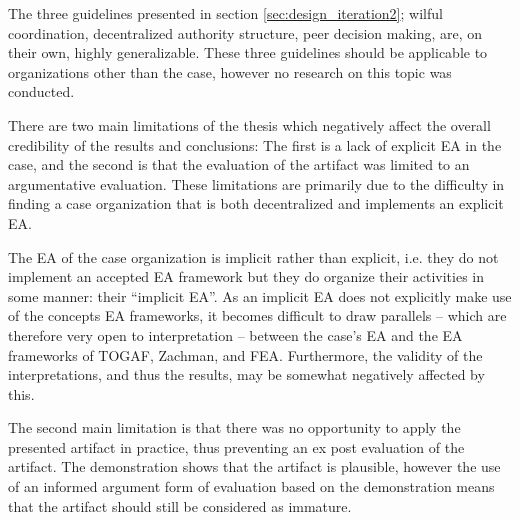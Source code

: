 %
%
%
%
%
%
The three guidelines presented in section \ref{sec:design_iteration2}; wilful coordination, decentralized authority structure, peer decision making, are, on their own, highly generalizable. These three guidelines should be applicable to organizations other than the case, however no research on this topic was conducted.

There are two main limitations of the thesis which negatively affect the overall credibility of the results and conclusions: The first is a lack of explicit EA in the case, and the second is that the evaluation of the artifact was limited to an argumentative evaluation. These limitations are primarily due to the difficulty in finding a case organization that is both decentralized and implements an explicit EA. 

The EA of the case organization is implicit rather than explicit, i.e. they do not implement an accepted EA framework but they do organize their activities in some manner: their ``implicit EA''. As an implicit EA does not explicitly make use of the concepts EA frameworks, it becomes difficult to draw parallels -- which are therefore very open to interpretation -- between the case's EA and the EA frameworks of TOGAF, Zachman, and FEA.  Furthermore, the validity of the interpretations, and thus the results, may be somewhat negatively affected by this.

The second main limitation is that there was no opportunity to apply the presented artifact in practice, thus preventing an ex post evaluation of the artifact. The demonstration shows that the artifact is plausible, however the use of an informed argument form of evaluation based on the demonstration means that the artifact should still be considered as immature.


  